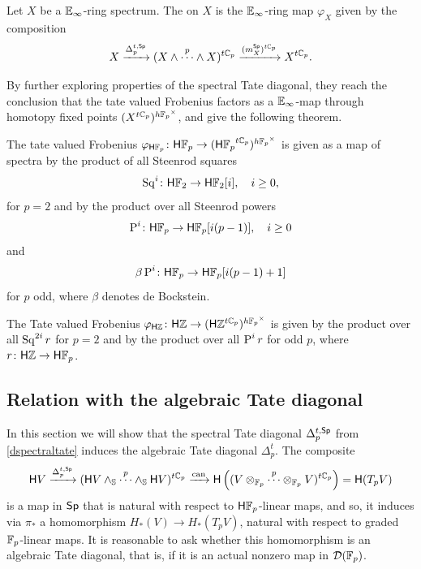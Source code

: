 \begin{definition}
	Let \(X\) be a \(\mathbb{E}_\infty\)-ring spectrum.
	The  on \(X\) is the \(\mathbb{E}_\infty\)-ring map \(\varphi_X\) given by the composition
	\[
	X\xrightarrow{\Delta_p^{t, \mathsf{Sp}}} (X \wedge \overset{p}{\cdots} \wedge X)^{t\mathbb{C}_p} \xrightarrow{(m_X^{\mathsf{Sp}})^{t\mathbb{C}_p}} X^{t\mathbb{C}_p}.
	\]
\end{definition}

By further exploring properties of the spectral Tate diagonal, they reach the conclusion that the tate valued Frobenius factors as a \(\mathbb{E}_\infty\)-map through homotopy fixed points \((X^{t\mathbb{C}_p})^{h{\mathbb{F}_p}^\times}\), and give the following theorem.

\begin{theorem}\label{Tfrobenius}
	The tate valued Frobenius \(\varphi_{\mathsf{H} {\mathbb{F}_p}} \colon \mathsf{H} {\mathbb{F}_p} \to (\mathsf{H} {\mathbb{F}_p}^{t\mathbb{C}_p})^{h{\mathbb{F}_p}^\times}\) is given as a map of spectra by the product of all Steenrod squares
	\[
	\operatorname{Sq}^i \colon \mathsf{H} {\mathbb{F}_2} \to \mathsf{H} {\mathbb{F}_2}[i], \quad i\geq 0,
	\]
	for \(p=2\) and by the product over all Steenrod powers
	\[
	\operatorname{P}^i \colon \mathsf{H} {\mathbb{F}_p} \to \mathsf{H} {\mathbb{F}_p} [i(p-1)], \quad i\geq 0
	\]
	and
	\[
	\beta \operatorname{P}^i \colon \mathsf{H} {\mathbb{F}_p} \to \mathsf{H} {\mathbb{F}_p} [i(p-1)+1]
	\]
	for \(p\) odd, where \(\beta\) denotes de Bockstein.
	
	The Tate valued Frobenius \(\varphi_{\mathsf{H} \mathbb{Z}} \colon \mathsf{H} \mathbb{Z} \to (\mathsf{H} \mathbb{Z}^{t\mathbb{C}_p})^{h{\mathbb{F}_p}^\times}\) is given by the product over all \(\operatorname{Sq}^{2i} r\) for \(p=2\) and by the product over all \(\operatorname{P}^i r\) for odd \(p\), where \(r \colon \mathsf{H} \mathbb{Z}\to \mathsf{H} {\mathbb{F}_p}\).
\end{theorem}

\subsection{Relation with the algebraic Tate diagonal}

In this section we will show that the spectral Tate diagonal  \(\Delta_p^{t,\mathsf{Sp}}\) from \cref{dspectraltate} induces the algebraic Tate diagonal \(\Delta^t_p\).
The composite
\[
\mathsf{H} V\xrightarrow{\Delta_p^{t,\mathsf{Sp}}} (\mathsf{H} V \wedge_{\mathbb{S}} \overset{p}{\cdots} \wedge_{\mathbb{S}} \mathsf{H} V)^{t\mathbb{C}_p} \xrightarrow{\operatorname{can}} \mathsf{H}\left((V \otimes_{\mathbb{F}_p} \overset{p}{\cdots} \otimes_{\mathbb{F}_p} V)^{t\mathbb{C}_p}\right) = \mathsf{H} (T_pV)
\]
is a map in \(\mathsf{Sp}\) that is natural with respect to \(\mathsf{H}{\mathbb{F}_p}\)-linear maps, and so, it induces via \(\pi_*\) a homomorphism \(H_*(V)\to H_*(T_p V)\), natural with respect to graded \({\mathbb{F}_p}\)-linear maps.
It is reasonable to ask whether this homomorphism is an algebraic Tate diagonal, that is, if it is an actual nonzero map in \(\mathcal{D}({\mathbb{F}_p})\).

